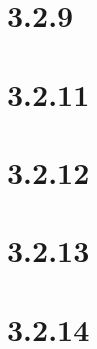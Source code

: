 \documentclass{article}
\begin{document}
\section{3.2.9}

\section{3.2.11}

\section{3.2.12}

\section{3.2.13}

\section{3.2.14}
\end{document}
